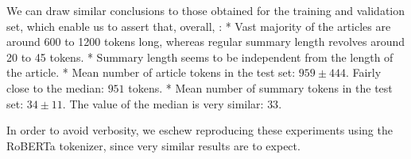 \documentclass[letterpaper,10pt,english]{sphinxmanual}
\begin{document}
\sphinxAtStartPar
We can draw similar conclusions to those obtained for the training and validation set, which enable us to assert that, overall, : * Vast majority of the articles are around 600 to 1200 tokens long, whereas regular summary length revolves around 20 to 45 tokens. * Summary length seems to be independent from the length of the article. * Mean number of article tokens in the test
set: \(959\pm444\). Fairly close to the median: \(951\) tokens. * Mean number of summary tokens in the test set: \(34\pm11\). The value of the median is very similar: \(33\).

\sphinxAtStartPar
In order to avoid verbosity, we eschew reproducing these experiments using the RoBERTa tokenizer, since very similar results are to expect.
\end{document}
